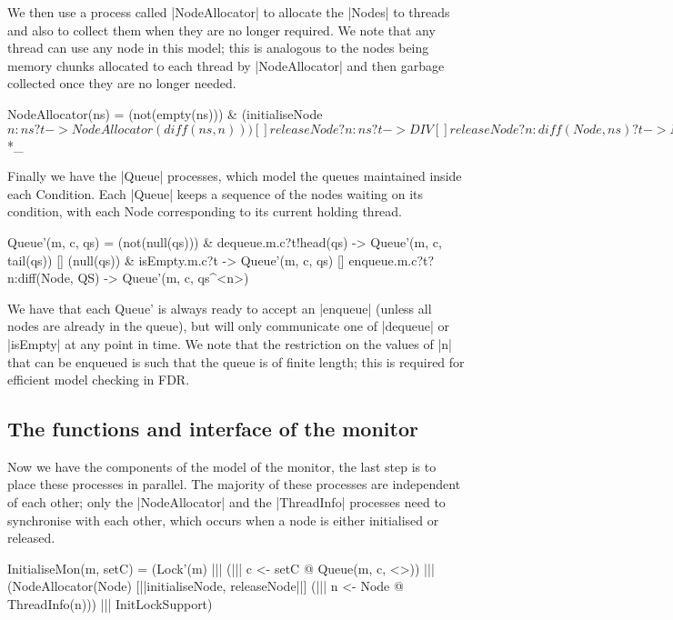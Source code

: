 We then use a process called |NodeAllocator| to allocate the |Nodes| to threads and also to collect them when they are no longer required.
We note that any thread can use any node in this model; this is analogous to the nodes being memory chunks allocated to each thread by |NodeAllocator| and then garbage collected once they are no longer needed.

\begin{cspm}
  NodeAllocator(ns) = 
    (not(empty(ns))) & 
      (initialiseNode$n:ns?t -> NodeAllocator(diff(ns, {n})))
  [] releaseNode?n:ns?t -> DIV
  [] releaseNode?n:diff(Node, ns)?t -> NodeAllocator(union(ns, {n}))_*$*_
\end{cspm}

Finally we have the |Queue| processes, which model the queues maintained inside each Condition. Each |Queue| keeps a sequence of the nodes waiting on its condition, with each Node corresponding to its current holding thread.

\begin{cspm}
  Queue'(m, c, qs) = 
       (not(null(qs))) & dequeue.m.c?t!head(qs) -> Queue'(m, c, tail(qs))
    [] (null(qs)) & isEmpty.m.c?t -> Queue'(m, c, qs)
    [] enqueue.m.c?t?n:diff(Node, QS) -> Queue'(m, c, qs^<n>) 
\end{cspm}

We have that each Queue' is always ready to accept an |enqueue| (unless all nodes are already in the queue), but will only communicate one of |dequeue| or |isEmpty| at any point in time. We note that the restriction on the values of |n| that can be enqueued is such that the queue is of finite length; this is required for efficient model checking in FDR.

\subsection{The functions and interface of the monitor}

Now we have the components of the model of the monitor, the last step is to place these processes in parallel. The majority of these processes are independent of each other; only the |NodeAllocator| and the |ThreadInfo| processes need to synchronise with each other, which occurs when a node is either initialised or released.
\begin{cspm}
  InitialiseMon(m, setC) = 
    (Lock'(m) ||| 
     (||| c <- setC @ Queue(m, c, <>)) |||
     (NodeAllocator(Node) [|{|initialiseNode, releaseNode|}|] 
        (||| n <- Node @ ThreadInfo(n))) ||| 
     InitLockSupport)
\end{cspm}


